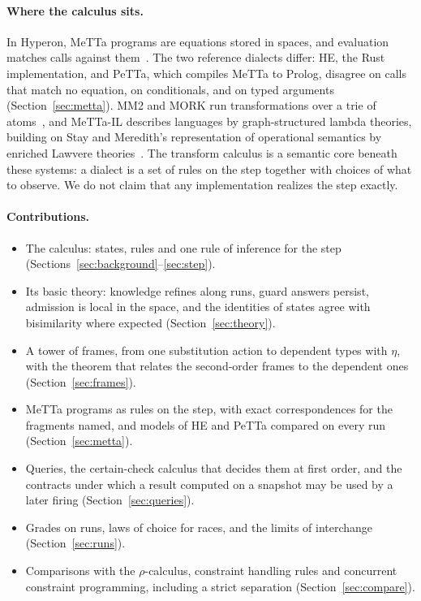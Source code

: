 \documentclass[11pt]{article}
\theoremstyle{plain}
\theoremstyle{definition}
\theoremstyle{remark}
\begin{document}
\paragraph{Where the calculus sits.} In Hyperon, MeTTa programs are equations stored in spaces,
and evaluation matches calls against them~\cite{meta-metta,goertzel-metta-spec}. The two
reference dialects differ: HE, the Rust implementation, and PeTTa, which compiles MeTTa to
Prolog, disagree on calls that match no equation, on conditionals, and on typed arguments
(Section~\ref{sec:metta}). MM2 and MORK run transformations over a trie of
atoms~\cite{mork-sources-sinks}, and MeTTa-IL describes languages by graph-structured lambda
theories, building on Stay and Meredith's representation of operational semantics by enriched
Lawvere theories~\cite{stay-meredith-lawvere}. The transform calculus is a semantic core beneath these
systems: a dialect is a set of rules on the step together with choices of what to observe. We
do not claim that any implementation realizes the step exactly.

\paragraph{Contributions.}
\begin{itemize}
\item The calculus: states, rules and one rule of inference for the step
  (Sections~\ref{sec:background}--\ref{sec:step}).
\item Its basic theory: knowledge refines along runs, guard answers persist, admission is local
  in the space, and the identities of states agree with bisimilarity where expected
  (Section~\ref{sec:theory}).
\item A tower of frames, from one substitution action to dependent types with $\eta$, with the
  theorem that relates the second-order frames to the dependent ones (Section~\ref{sec:frames}).
\item MeTTa programs as rules on the step, with exact correspondences for the fragments named,
  and models of HE and PeTTa compared on every run (Section~\ref{sec:metta}).
\item Queries, the certain-check calculus that decides them at first order, and the contracts
  under which a result computed on a snapshot may be used by a later firing
  (Section~\ref{sec:queries}).
\item Grades on runs, laws of choice for races, and the limits of interchange
  (Section~\ref{sec:runs}).
\item Comparisons with the $\rho$-calculus, constraint handling rules and concurrent constraint
  programming, including a strict separation (Section~\ref{sec:compare}).
\end{itemize}
\end{document}
